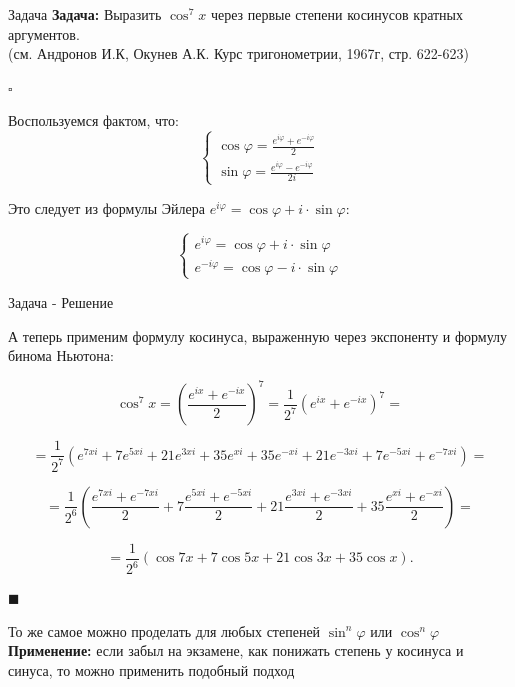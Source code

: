 \documentclass[8pt, aspectratio=169]{beamer}
\begin{document}
\begin{frame}{Задача}
\textbf{Задача:}
Выразить $\cos^7{x}$ через первые степени косинусов кратных аргументов.
\\(см. Андронов И.К, Окунев А.К. Курс тригонометрии, 1967г, стр. 622-623)

$\square$

Воспользуемся фактом, что:
$$
\left\{
\begin{matrix}
\cos{\varphi} = \frac{e^{i\varphi} + e^{-i\varphi}}{2} \\
\sin{\varphi} = \frac{e^{i\varphi} - e^{-i\varphi}}{2i}
\end{matrix}
\right .
$$

Это следует из формулы Эйлера $e^{i\varphi} = \cos{\varphi} + i\cdot\sin{\varphi}$:

$$
\left \{
\begin{matrix}
e^{i\varphi} = \cos{\varphi} + i\cdot\sin{\varphi} \\
e^{-i\varphi} = \cos{\varphi} - i\cdot\sin{\varphi}
\end{matrix}
\right .
$$

\end{frame}

\begin{frame}{Задача - Решение}

А теперь применим формулу косинуса, выраженную через экспоненту и формулу бинома Ньютона:

$$
\cos^{7}x = \left( \frac{e^{ix} + e^{-ix}}{2} \right)^{7} = \frac{1}{2^{7}} (e^{ix} + e^{-ix})^{7} =
$$

$$
= \frac{1}{2^{7}} (e^{7xi} + 7e^{5xi} + 21e^{3xi} + 35e^{xi} + 35e^{-xi} + 21e^{-3xi} + 7e^{-5xi} + e^{-7xi}) =
$$

$$
= \frac{1}{2^{6}} \left( \frac{e^{7xi} + e^{-7xi}}{2} + 7 \frac{e^{5xi} + e^{-5xi}}{2} + 21 \frac{e^{3xi} + e^{-3xi}}{2} +  35 \frac{e^{xi} + e^{-xi}}{2} \right) =
$$

$$
= \frac{1}{2^{6}} (\cos 7x + 7 \cos 5x + 21 \cos 3x + 35 \cos x).
$$

$\blacksquare$

То же самое можно проделать для любых степеней $\sin^n{\varphi}$ или $\cos^n{\varphi}$ \\
\textbf{Применение:} если забыл на экзамене, как понижать степень у косинуса и синуса, то можно применить подобный подход

\end{frame}
\end{document}
